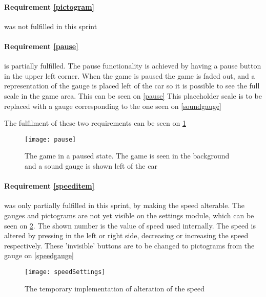 \paragraph{Requirement \ref{pictogram}} was not fulfilled in this sprint


\paragraph{Requirement \ref{pause}} is partially fulfilled.
The pause functionality is achieved by having a pause button in the upper left corner. 
When the game is paused the game is faded out, and a representation of the gauge is placed left of the car so it is possible to see the full scale in the game area.
This can be seen on \cref{pause}
This placeholder scale is to be replaced with a gauge corresponding to the one seen on \cref{soundgauge}

The fulfilment of these two requirements can be seen on \cref{pausedstate}

\begin{figure}
\texttt{[image: pause]}	
\caption{The game in a paused state. The game is seen in the background and a sound gauge is shown left of the car}
\label{pausedstate}
\end{figure}


\paragraph{Requirement \ref{speeditem}} was only partially fulfilled in this sprint, by making the speed alterable. 
The gauges and pictograms are not yet visible on the settings module, which can be seen on \cref{speedsettings}.
The shown number is the value of speed used internally.
The speed is altered by pressing in the left or right side, decreasing or increasing the speed respectively.
These 'invisible' buttons are to be changed to pictograms from the gauge on \cref{speedgauge}

\begin{figure}
\texttt{[image: speedSettings]}
\caption{The temporary implementation of alteration of the speed}
\label{speedsettings}
\end{figure}



